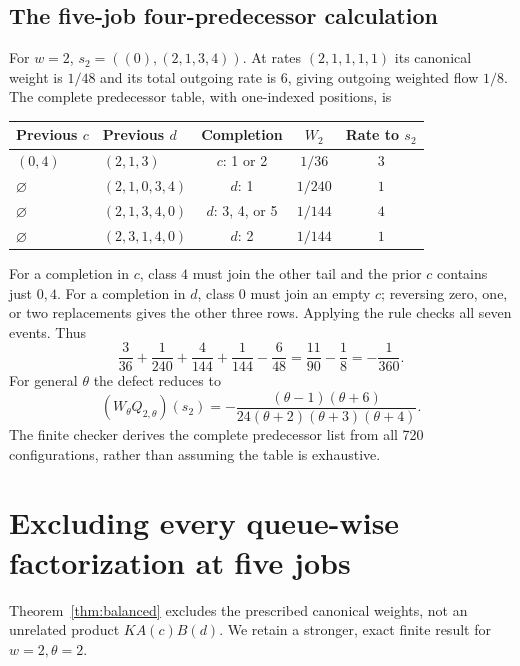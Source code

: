 \documentclass[11pt]{article}
\theoremstyle{remark}
\newcommand{\W}{W_\theta}
\newcommand{\emptyq}{\varnothing}
\begin{document}
\subsection{The five-job four-predecessor calculation}\label{sec:five}
For $w=2$, $s_2=((0),(2,1,3,4))$. At rates $(2,1,1,1,1)$ its canonical weight is $1/48$ and its total outgoing rate is $6$, giving outgoing weighted flow $1/8$. The complete predecessor table, with one-indexed positions, is
\begin{center}
\small
\begin{tabular}{llccc}
\toprule
Previous $c$ & Previous $d$ & Completion & $W_2$ & Rate to $s_2$\\
\midrule
$(0,4)$ & $(2,1,3)$ & $c$: 1 or 2 & $1/36$ & $3$\\
$\emptyq$ & $(2,1,0,3,4)$ & $d$: 1 & $1/240$ & $1$\\
$\emptyq$ & $(2,1,3,4,0)$ & $d$: 3, 4, or 5 & $1/144$ & $4$\\
$\emptyq$ & $(2,3,1,4,0)$ & $d$: 2 & $1/144$ & $1$\\
\bottomrule
\end{tabular}
\end{center}
For a completion in $c$, class $4$ must join the other tail and the prior $c$ contains just $0,4$. For a completion in $d$, class $0$ must join an empty $c$; reversing zero, one, or two replacements gives the other three rows. Applying the rule checks all seven events. Thus
\[
 \frac{3}{36}+\frac{1}{240}+\frac{4}{144}+\frac{1}{144}-\frac{6}{48}
 =\frac{11}{90}-\frac18=-\frac1{360}.
\]
For general $\theta$ the defect reduces to
\[
 (\W Q_{2,\theta})(s_2)
 =-\frac{(\theta-1)(\theta+6)}{24(\theta+2)(\theta+3)(\theta+4)}.
\]
The finite checker derives the complete predecessor list from all 720 configurations, rather than assuming the table is exhaustive.

\section{Excluding every queue-wise factorization at five jobs}\label{sec:certificate}
Theorem~\ref{thm:balanced} excludes the prescribed canonical weights, not an unrelated product $KA(c)B(d)$. We retain a stronger, exact finite result for $w=2,\theta=2$.
\end{document}
